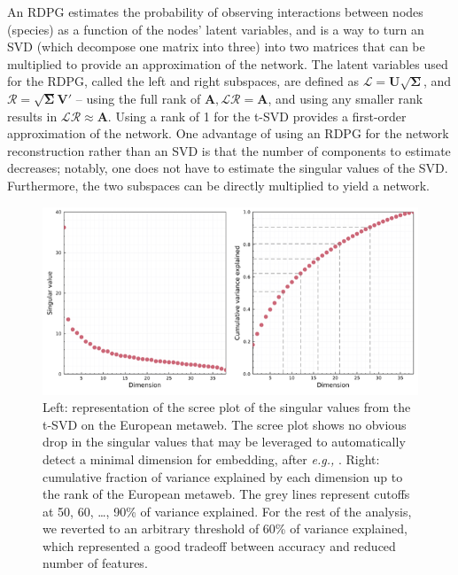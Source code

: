 \begin{refsection}
An RDPG estimates the probability of observing interactions between
nodes (species) as a function of the nodes' latent variables, and is a
way to turn an SVD (which decompose one matrix into three) into two
matrices that can be multiplied to provide an approximation of the
network. The latent variables used for the RDPG, called the left and
right subspaces, are defined as
$\mathscr{L} = \mathbf{U}\sqrt{\mathbf{\Sigma}}$, and
$\mathscr{R} = \sqrt{\mathbf{\Sigma}}\mathbf{V}'$ -- using the full
rank of $\mathbf{A}, \mathscr{L}\mathscr{R} = \mathbf{A}$, and
using any smaller rank results in
$\mathscr{L}\mathscr{R} \approx \mathbf{A}$. Using a rank of 1 for the
t-SVD provides a first-order approximation of the network. One advantage
of using an RDPG for the network reconstruction rather than an SVD is
that the number of components to estimate decreases; notably, one does
not have to estimate the singular values of the SVD. Furthermore, the
two subspaces can be directly multiplied to yield a network.

\begin{figure}[h]
    \centering
    \includegraphics[width=\textwidth]{figures/figure-screeplot.png}
    \caption{Left: representation of the scree plot of the singular values
from the t-SVD on the European metaweb. The scree plot shows no obvious
drop in the singular values that may be leveraged to automatically
detect a minimal dimension for embedding, after \emph{e.g.,}
\cite{Zhu2006Automatic}. Right: cumulative fraction of variance explained by each
dimension up to the rank of the European metaweb. The grey lines
represent cutoffs at 50, 60, \ldots, 90\% of variance explained. For the
rest of the analysis, we reverted to an arbitrary threshold of 60\% of
variance explained, which represented a good tradeoff between accuracy
and reduced number of features.}
    \label{fig:scree}
\end{figure}


\end{refsection}
